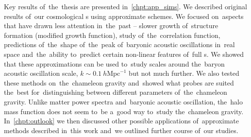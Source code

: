 Key results of~the~thesis are presented in~\autoref{chpt:app_sims}. We described original results of~our cosmological \nbodysim s using approximate schemes. We focused on~aspects that have drawn less attention in~the~past -- slower growth of~structure formation (modified growth function), study of~the~correlation function, predictions of~the~shape of~the~peak of~baryonic acoustic oscillations in~real space and~the~ability to~predict certain non-linear features of~full \nbodysim s. We showed that these approximations can be used to~study scales around the~baryon acoustic oscillation scale, $k\sim 0.1~h\text{Mpc}^{-1}$ but not much further. We also tested these methods on~the~chameleon gravity and~showed what probes are suited the~best for~distinguishing between different parameters of~the~chameleon gravity. Unlike matter power spectra and~baryonic acoustic oscillation, the~halo mass function does not seem to~be a~good way to~study the~chameleon gravity. In~\autoref{chpt:outlook} we then discussed other possible applications of~approximate methods described in~this work and~we outlined further course of~our studies.
%

